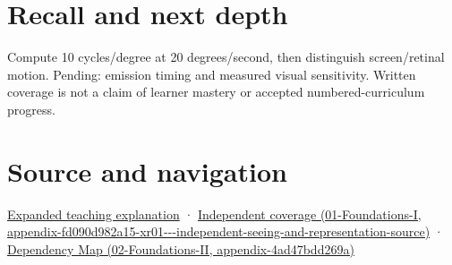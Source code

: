 \section{Recall and next depth}\label{appendix-70895739febb-recall-and-next-depth}

Compute 10 cycles/degree at 20 degrees/second, then distinguish screen/retinal motion. Pending: emission timing and measured visual sensitivity. Written coverage is not a claim of learner mastery or accepted numbered-curriculum progress.

\section{Source and navigation}\label{appendix-70895739febb-source-and-navigation}

\href{Continuous\%20Notes/University\%20-\%20Worlds,\%20Images\%20and\%20Inference\%20-\%20Graphics,\%20Vision\%20and\%20Photography\#A\%20gaze\%20sample\%20needs\%20a\%20time\%20as\%20well\%20as\%20a\%20direction}{Expanded teaching explanation} · \href{../01-Foundations-I/main.pdf\#nameddest=appendix-fd090d982a15-xr01---independent-seeing-and-representation-source}{Independent coverage (01-Foundations-I, appendix-fd090d982a15-xr01-\/-\/-independent-seeing-and-representation-source)} · \href{../02-Foundations-II/main.pdf\#nameddest=appendix-4ad47bdd269a}{Dependency Map (02-Foundations-II, appendix-4ad47bdd269a)}
